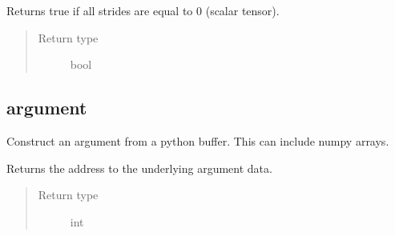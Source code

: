 \documentclass[letterpaper,10pt,english]{sphinxmanual}
\begin{document}

\begin{fulllineitems}
\label{\detokenize{reference/py:migraphx.scalar}}
\sphinxAtStartPar
Returns true if all strides are equal to 0 (scalar tensor).
\begin{quote}\begin{description}
\item[{Return type}] \leavevmode
\sphinxAtStartPar
bool

\end{description}\end{quote}

\end{fulllineitems}



\subsection{argument}
\label{\detokenize{reference/py:argument}}

\begin{fulllineitems}
\label{\detokenize{reference/py:migraphx.argument}}
\sphinxAtStartPar
Construct an argument from a python buffer. This can include numpy arrays.

\end{fulllineitems}


\begin{fulllineitems}
\label{\detokenize{reference/py:migraphx.data_ptr}}
\sphinxAtStartPar
Returns the address to the underlying argument data.
\begin{quote}\begin{description}
\item[{Return type}] \leavevmode
\sphinxAtStartPar
int

\end{description}\end{quote}

\end{fulllineitems}
\end{document}
